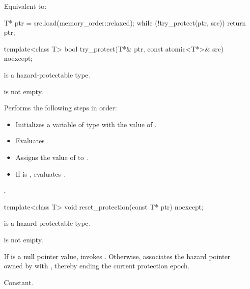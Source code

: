 \begin{itemdescr}
\pnum
\effects
Equivalent to:
\begin{codeblock}
T* ptr = src.load(memory_order::relaxed);
while (!try_protect(ptr, src)) {}
return ptr;
\end{codeblock}
\end{itemdescr}

%
\begin{itemdecl}
template<class T> bool try_protect(T*& ptr, const atomic<T*>& src) noexcept;
\end{itemdecl}

\begin{itemdescr}
\pnum
\mandates
{} is a hazard-protectable type.

\pnum
\expects
{} is not empty.

\pnum
\effects
Performs the following steps in order:
\begin{itemize}
\item Initializes a variable  of type  with the value of .
\item Evaluates .
\item Assigns the value of  to .
\item If  is ,
evaluates .
\end{itemize}

\pnum
\returns
{}.
\end{itemdescr}

%
\begin{itemdecl}
template<class T> void reset_protection(const T* ptr) noexcept;
\end{itemdecl}

\begin{itemdescr}
\pnum
\mandates
{} is a hazard-protectable type.

\pnum
\expects
{} is not empty.

\pnum
\effects
If  is a null pointer value, invokes .
Otherwise,
associates the hazard pointer owned by  with ,
thereby ending the current protection epoch.

\pnum
\complexity
Constant.
\end{itemdescr}

